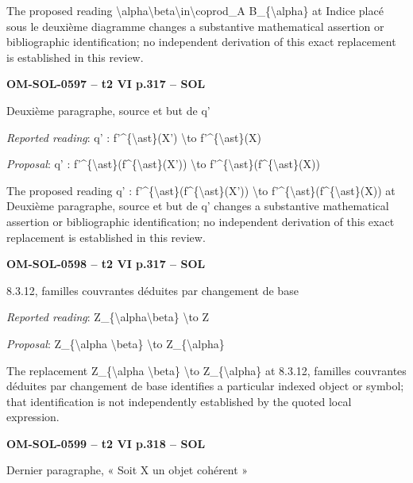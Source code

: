 The proposed reading \textbackslash{}alpha\textbackslash{}beta\textbackslash{}in\textbackslash{}coprod\_A B\_\{\textbackslash{}alpha\} at Indice placé sous le deuxième diagramme changes a substantive mathematical assertion or bibliographic identification; no independent derivation of this exact replacement is established in this review.\par
\par\noindent\textbf{OM-SOL-0597 -- t2 VI p.317 -- SOL}\par
Deuxième paragraphe, source et but de q'\par
\emph{Reported reading}: q' : f'\textasciicircum{}\{\textbackslash{}ast\}(X') \textbackslash{}to f'\textasciicircum{}\{\textbackslash{}ast\}(X)\par
\emph{Proposal}: q' : f'\textasciicircum{}\{\textbackslash{}ast\}(f\textasciicircum{}\{\textbackslash{}ast\}(X')) \textbackslash{}to f'\textasciicircum{}\{\textbackslash{}ast\}(f\textasciicircum{}\{\textbackslash{}ast\}(X))\par
The proposed reading q' : f'\textasciicircum{}\{\textbackslash{}ast\}(f\textasciicircum{}\{\textbackslash{}ast\}(X')) \textbackslash{}to f'\textasciicircum{}\{\textbackslash{}ast\}(f\textasciicircum{}\{\textbackslash{}ast\}(X)) at Deuxième paragraphe, source et but de q' changes a substantive mathematical assertion or bibliographic identification; no independent derivation of this exact replacement is established in this review.\par
\par\noindent\textbf{OM-SOL-0598 -- t2 VI p.317 -- SOL}\par
8.3.12, familles couvrantes déduites par changement de base\par
\emph{Reported reading}: Z\_\{\textbackslash{}alpha\textbackslash{}beta\} \textbackslash{}to Z\par
\emph{Proposal}: Z\_\{\textbackslash{}alpha \textbackslash{}beta\} \textbackslash{}to Z\_\{\textbackslash{}alpha\}\par
The replacement Z\_\{\textbackslash{}alpha \textbackslash{}beta\} \textbackslash{}to Z\_\{\textbackslash{}alpha\} at 8.3.12, familles couvrantes déduites par changement de base identifies a particular indexed object or symbol; that identification is not independently established by the quoted local expression.\par
\par\noindent\textbf{OM-SOL-0599 -- t2 VI p.318 -- SOL}\par
Dernier paragraphe, « Soit X un objet cohérent »\par
